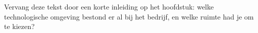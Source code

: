 
\chapter{}%
\label{ch:technologie}


Vervang deze tekst door een korte inleiding op het hoofdstuk: welke
technologische omgeving bestond er al bij het bedrijf, en welke ruimte had je
om te kiezen?

\section{}%
\label{sec:bestaande-omgeving}


\section{}%
\label{sec:vergelijking}


